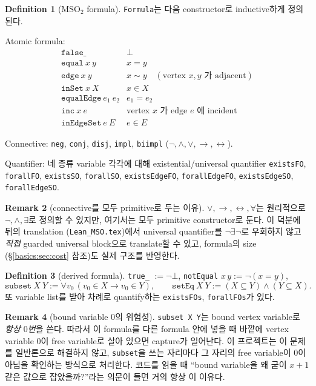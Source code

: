 \documentclass[11pt]{article}
\theoremstyle{definition}
\newtheorem{definition}{Definition}[section]
\newtheorem{remark}[definition]{Remark}
\theoremstyle{plain}
\newcommand{\MSOtwo}{\mathrm{MSO}_2}
\newcommand{\lean}[1]{\texttt{#1}}
\newcommand{\leanfile}[1]{\texttt{#1}}
\begin{document}
\begin{definition}[$\MSOtwo$ formula]
\label{basics:def:formula}
\lean{Formula}는 다음 constructor로 inductive하게 정의된다.

Atomic formula:
\[
\begin{array}{ll}
  \lean{false\_} & \bot \\
  \lean{equal}\ x\ y & x = y \\
  \lean{edge}\ x\ y & x \sim y \quad (\text{vertex } x,y \text{ 가 adjacent}) \\
  \lean{inSet}\ x\ X & x \in X \\
  \lean{equalEdge}\ e_1\ e_2 & e_1 = e_2 \\
  \lean{inc}\ x\ e & \text{vertex } x \text{ 가 edge } e \text{ 에 incident} \\
  \lean{inEdgeSet}\ e\ E & e \in E
\end{array}
\]

Connective: \lean{neg}, \lean{conj}, \lean{disj}, \lean{impl},
\lean{biimpl} ($\lnot, \land, \lor, \to, \leftrightarrow$).

Quantifier: 네 종류 variable 각각에 대해 existential/universal quantifier
\lean{existsFO}, \lean{forallFO}, \lean{existsSO}, \lean{forallSO},
\lean{existsEdgeFO}, \lean{forallEdgeFO}, \lean{existsEdgeSO},
\lean{forallEdgeSO}.
\end{definition}

\begin{remark}[connective를 모두 primitive로 두는 이유]
$\lor, \to, \leftrightarrow, \forall$는 원리적으로 $\lnot, \land, \exists$로
정의할 수 있지만, 여기서는 모두 primitive constructor로 둔다. 이 덕분에 뒤의
translation (\leanfile{Lean\_MSO.tex})에서 universal quantifier를
$\lnot \exists \lnot$로 우회하지 않고 \emph{직접} guarded universal block으로
translate할 수 있고, formula의 size (\S\ref{basics:sec:cost} 참조)도 실제
구조를 반영한다.
\end{remark}

\begin{definition}[derived formula]
\label{basics:def:derived}
\lean{true\_} $:= \lnot\bot$, \lean{notEqual} $x\,y := \lnot(x=y)$,
\[
  \lean{subset}\ X\ Y := \forall v_0\,(v_0 \in X \to v_0 \in Y),
  \qquad
  \lean{setEq}\ X\ Y := (X \subseteq Y) \land (Y \subseteq X).
\]
또 variable list를 받아 차례로 quantify하는 \lean{existsFOs},
\lean{forallFOs}가 있다.
\end{definition}

\begin{remark}[bound variable $0$의 위험성]
\label{basics:rem:subsetcapture}
\lean{subset X Y}는 bound vertex variable로 \emph{항상 $0$번}을 쓴다. 따라서
이 formula를 다른 formula 안에 넣을 때 바깥에 vertex variable $0$이 free
variable로 살아 있으면 capture가 일어난다. 이 프로젝트는 이 문제를 일반론으로
해결하지 않고, \lean{subset}을 쓰는 자리마다 그 자리의 free variable이 $0$이
아님을 확인하는 방식으로 처리한다. 코드를 읽을 때 ``bound variable을 왜 굳이
$x+1$ 같은 값으로 잡았을까?''라는 의문이 들면 거의 항상 이 이유다.
\end{remark}
\end{document}
